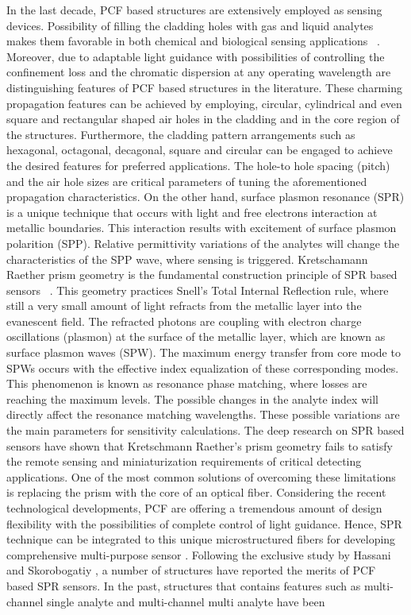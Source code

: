 \documentclass[journal]{IEEEtran}
\begin{document}
In the last decade, PCF based structures are extensively employed as sensing devices. Possibility of filling the cladding holes with gas and liquid analytes makes them favorable in both chemical and biological sensing applications  \cite{wang2011selectively,rifat2016highly,caucheteur2015review,dash2014spr}. Moreover, due to adaptable light guidance with possibilities of controlling the confinement loss and the chromatic dispersion at any operating wavelength are distinguishing features of PCF based structures in the literature. These charming propagation features can be achieved by employing, circular, cylindrical and even square and rectangular shaped \cite{wang2015simulation} air holes in the cladding and in the core region of the structures. Furthermore, the cladding pattern arrangements such as hexagonal, octagonal, decagonal, square and circular \cite{wang2011selectively,bouk2004dispersion,ademgil2014highly,razzak2007chromatic} can be engaged to achieve the desired features for preferred applications. The hole-to hole spacing (pitch) and the air hole sizes are critical parameters of tuning the aforementioned propagation characteristics. On the other hand, surface plasmon resonance (SPR) is a unique technique that occurs with light and free electrons interaction at metallic boundaries. This interaction results with excitement of surface plasmon polarition (SPP). Relative permittivity variations of the analytes will change the characteristics of the SPP wave, where sensing is triggered. Kretschamann Raether prism geometry is the fundamental construction principle of SPR based sensors  \cite{kretschmann1968radiative}. This geometry practices Snell's Total Internal Reflection rule, where still a very small amount of light refracts from the metallic layer into the evanescent field. The refracted photons are coupling with electron charge oscillations (plasmon) at the surface of the metallic layer, which are known as surface plasmon waves (SPW). The maximum energy transfer from core mode to SPWs occurs with the effective index equalization of these corresponding modes. This phenomenon is known as resonance phase matching, where losses are reaching the maximum levels. The possible changes in the analyte index will directly affect the resonance matching wavelengths. These possible variations are the main parameters for sensitivity calculations. The deep research on SPR based sensors have shown that Kretschmann Raether's prism geometry fails to satisfy the remote sensing and miniaturization requirements of critical detecting applications. One of the most common solutions of overcoming these limitations is replacing the prism with the core of an optical fiber. Considering the recent technological developments, PCF are offering a tremendous amount of design flexibility with the possibilities of complete control of light guidance. Hence, SPR technique can be integrated to this unique microstructured fibers for developing comprehensive multi-purpose sensor \cite{rifat2016highly,yasli2019effect}. Following the exclusive study by Hassani and Skorobogatiy \cite{hassani2006design}, a number of structures have reported the merits of PCF based SPR sensors. In the past, structures that contains features such as multi-channel single analyte and multi-channel multi analyte have been 
\end{document}
